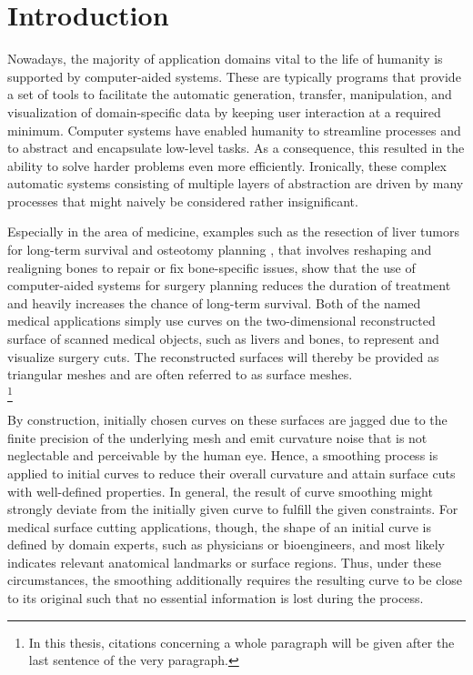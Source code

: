 \documentclass{stdlocal}
\begin{document}
\section{Introduction} %
\label{sec:introduction}

Nowadays, the majority of application domains vital to the life of humanity is supported by computer-aided systems.
These are typically programs that provide a set of tools to facilitate the automatic generation, transfer, manipulation, and visualization of domain-specific data by keeping user interaction at a required minimum.
Computer systems have enabled humanity to streamline processes and to abstract and encapsulate low-level tasks.
As a consequence, this resulted in the ability to solve harder problems even more efficiently.
Ironically, these complex automatic systems consisting of multiple layers of abstraction are driven by many processes that might naively be considered rather insignificant.

Especially in the area of medicine, examples such as the resection of liver tumors for long-term survival \autocite{alirr2019} and osteotomy planning \autocite{zachow2003}, that involves reshaping and realigning bones to repair or fix bone-specific issues, show that the use of computer-aided systems for surgery planning reduces the duration of treatment and heavily increases the chance of long-term survival.
Both of the named medical applications simply use curves on the two-dimensional reconstructed surface of scanned medical objects, such as livers and bones, to represent and visualize surgery cuts.
The reconstructed surfaces will thereby be provided as triangular meshes and are often referred to as surface meshes. \\
\autocite{zachow2003,alirr2019}\footnote{In this thesis, citations concerning a whole paragraph will be given after the last sentence of the very paragraph.}

By construction, initially chosen curves on these surfaces are jagged due to the finite precision of the underlying mesh and emit curvature noise that is not neglectable and perceivable by the human eye.
Hence, a smoothing process is applied to initial curves to reduce their overall curvature and attain surface cuts with well-defined properties.
In general, the result of curve smoothing might strongly deviate from the initially given curve to fulfill the given constraints.
For medical surface cutting applications, though, the shape of an initial curve is defined by domain experts, such as physicians or bioengineers, and most likely indicates relevant anatomical landmarks or surface regions.
Thus, under these circumstances, the smoothing additionally requires the resulting curve to be close to its original such that no essential information is lost during the process.
\autocite{lawonn2014}
\end{document}

